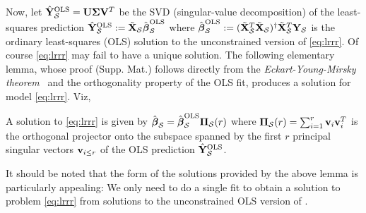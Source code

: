 Now, let $\hat{\mathbf{Y}}_{\mathcal S}^{\text{OLS}} = \mathbf{U} \boldsymbol{\Sigma} \mathbf{V}^T$ be the SVD
(singular-value decomposition) of the least-squares prediction
$\hat{\mathbf{Y}}_{\mathcal S}^{\text{OLS}} := \tilde{\mathbf{X}}_{\mathcal S}\hat{\boldsymbol{\beta}}_{\mathcal S}^{\text{OLS}}$ where
$\hat{\boldsymbol{\beta}}_{\mathcal S}^{\text{OLS}} := (\tilde{\mathbf{X}}_{\mathcal S}^T\tilde{\mathbf{X}}_{\mathcal S})^\dagger\tilde{\mathbf{X}}_{\mathcal S}^T\mathbf{Y}_{\mathcal S}$
is the ordinary least-squares (OLS) solution to the unconstrained version of \eqref{eq:lrrr}.
Of course \eqref{eq:lrrr} may fail to have a unique solution. The following elementary lemma,
whose proof  (Supp. Mat.) follows directly from the \textit{Eckart-Young-Mirsky theorem}~\citep{eckart2000}
and the orthogonality property of the OLS fit, produces a solution for model \eqref{eq:lrrr}. Viz,
\begin{lemma}
   A solution to \eqref{eq:lrrr} is given by
$\hat{\boldsymbol{\beta}}_{\mathcal S} = \hat{\boldsymbol{\beta}}_{\mathcal S}^{\text{OLS}}\boldsymbol{\Pi}_{\mathcal S}(r)$
  where $\boldsymbol{\Pi}_{\mathcal S}(r) = \sum_{i=1}^{r}\mathbf{v}_i\mathbf{v}_i^T$ is the orthogonal
  projector onto the subspace spanned by the first $r$ principal singular vectors $\mathbf{v}_{i \le r}$
  of the OLS prediction $\hat{\mathbf{Y}}_{\mathcal S}^{\text{OLS}}$.
  \label{thm:eym}
\end{lemma}

It should be noted that the form of the solutions provided by the above lemma is particularly
  appealing: We only need to do a single fit to obtain a solution to problem \eqref{eq:lrrr}
  from solutions to the unconstrained OLS version of \citep{tavor2016task}.


